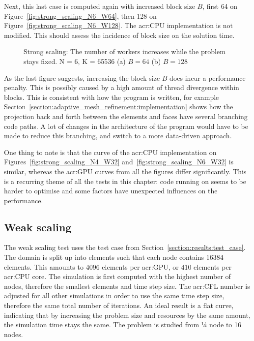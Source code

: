 Next, this last case is computed again with increased block size \(B\), first 64 on
Figure~\ref{fig:strong_scaling_N6_W64}, then 128 on Figure~\ref{fig:strong_scaling_N6_W128}. The
\acrshort{acr:CPU} implementation is not modified. This should assess the incidence of block size on
the solution time.

\begin{figure}[H]
	\centering
	\subfloat[\(B = 64\)]
	{\label{fig:strong_scaling_N6_W64}}
	\hfill
	\subfloat[\(B = 128\)]
	{\label{fig:strong_scaling_N6_W128}}
	\caption{Strong scaling: The number of workers increases while the problem stays fixed. N = 6, K = 65536 (a) \(B = 64\) (b) \(B = 128\)}\label{fig:strong_scaling_N6_W64-128}
\end{figure}

As the last figure suggests, increasing the block size \(B\) does incur a performance penalty. This
is possibly caused by a high amount of thread divergence within blocks. This is consistent with how
the program is written, for example Section~\ref{section:adaptive_mesh_refinement:implementation}
shows how the projection back and forth between the elements and faces have several branching code
paths. A lot of changes in the architecture of the program would have to be made to reduce this
branching, and switch to a more data-driven approach.

One thing to note is that the curve of the \acrshort{acr:CPU} implementation on
Figures~\ref{fig:strong_scaling_N4_W32} and~\ref{fig:strong_scaling_N6_W32} is similar, whereas the
\acrshort{acr:GPU} curves from all the figures differ significantly. This is a recurring theme of
all the tests in this chapter: code running on  seems to be harder to optimise
and some factors have unexpected influences on the performance.

\subsection{Weak scaling}\label{subsection:results:scaling_tests:weak}

The weak scaling test uses the test case from Section~\ref{section:results:test_case}. The domain is
split up into elements such that each node contains 16384 elements. This amounts to 4096 elements
per \acrshort{acr:GPU}, or 410 elements per \acrshort{acr:CPU} core. The simulation is first
computed with the highest number of nodes, therefore the smallest elements and time step size. The
\acrshort{acr:CFL} number is adjusted for all other simulations in order to use the same time step
size, therefore the same total number of iterations. An ideal result is a flat curve, indicating
that by increasing the problem size and resources by the same amount, the simulation time stays the
same. The problem is studied from ¼ node to 16 nodes.

